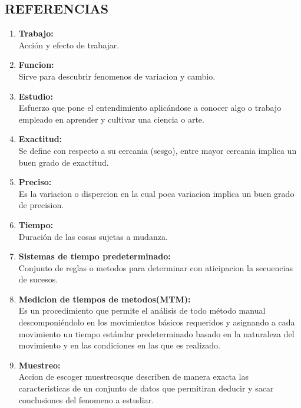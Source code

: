\subsection{REFERENCIAS}
\usepackage{pdfpages}
\begin{enumerate}

    \item \textbf {Trabajo:}
    \\Acción y efecto de trabajar.
    

 
 
    \item  \textbf {Funcion: }
    \\Sirve para descubrir fenomenos de variacion y cambio.
    \item \textbf  {Estudio: }
    \\Esfuerzo que pone el entendimiento aplicándose a conocer algo o   trabajo empleado en aprender y cultivar una ciencia o arte.
    
    \item  \textbf {Exactitud: }
    \\Se define con respecto a su cercania (sesgo), entre mayor cercania implica un buen grado de exactitud.  
    
    \item  \textbf {Preciso: }
    \\Es la variacion o dispercion en la cual poca variacion implica un buen grado de precision.
    
    
    \item \textbf  {Tiempo:}
    \\Duración de las cosas sujetas a mudanza.
    \item  \textbf {Sistemas de tiempo predeterminado:}
    \\Conjunto de reglas o metodos para determinar con aticipacion la secuencias de sucesos.
    \item \textbf { Medicion de tiempos de metodos(MTM):}
    \\Es un procedimiento que permite el análisis de todo método manual descomponiéndolo en los movimientos básicos requeridos y asignando a cada movimiento un tiempo estándar predeterminado basado en la naturaleza del movimiento y en las condiciones en las que es realizado.
    \item  \textbf {Muestreo: }
    \\Accion de escoger muestreosque describen de manera exacta las caracteristicas de un conjunto de datos que permitiran deducir y sacar conclusiones del fenomeno a estudiar.
  

\end{enumerate}
